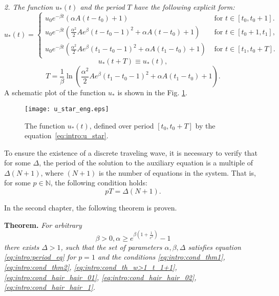 \textit{2. The function $u_*(t)$ and the period $T$ have the following explicit form:}
%
\small
\begin{equation}
	\label{eq:intro:u_star}
	u_*(t)=
	\begin{cases}
		u_0 e^{-\beta t}(\alpha A(t-t_0)+1) & \text{ for } t\in[t_0,t_0+1].
		\\
		u_0 e^{-\beta t}\left(\frac{\alpha^2}{2}Ae^{\beta}(t-t_0-1)^2+\alpha A(t-t_0)+1\right) & \text{ for } t\in[t_0+1,t_1],
		\\
		u_0 e^{-\beta t}\left(\frac{\alpha^2}{2}Ae^{\beta}(t_1-t_0-1)^2+\alpha A(t_1-t_0)+1\right) & \text{ for } t\in[t_1,t_0+T].
	\end{cases}
\end{equation}
\normalsize
%
\[
u_*(t + T) \equiv u_*(t),
\]
%
\begin{equation}
	\label{eq:intro:mg_period_T}
	T = \dfrac{1}{\beta}\ln\left( \frac{\alpha^2}{2}Ae^{\beta}(t_1-t_0-1)^2+\alpha A(t_1-t_0)+1\right). 
\end{equation}
%
A schematic plot of the function $u_*$ is shown in the Fig. \ref{fig:intro:u_star}.
%
\begin{figure}[h]
	\centering
	\texttt{[image: u\_star\_eng.eps]}
	\caption{The function $u_*(t)$, defined over period $[t_0, t_0 + T]$ by the equation~\eqref{eq:intro:u_star}.}
	\label{fig:intro:u_star}
\end{figure}

To ensure the existence of a discrete traveling wave, it is necessary to verify that for some $\Delta$, the period of the solution to the auxiliary equation is a multiple of $\Delta (N + 1)$, where $(N + 1)$ is the number of equations in the system. That is, for some $p \in \mathbb{N}$, the following condition holds:
\begin{equation}
	\label{eq:intro:period_eq}
	pT = \Delta (N + 1).
\end{equation}

In the second chapter, the following theorem is proven.

\textbf{Theorem.} \textit{For arbitrary
	\begin{equation}
		\label{eq:intro:constraints_parameters_final}
		\beta > 0, \alpha \geq e^{\beta\left(1 + \frac{1}{e^{\beta}}\right)} - 1
	\end{equation}
	there exists $\Delta > 1$, such that the set of parameters $\alpha, \beta, \Delta$ satisfies equation \eqref{eq:intro:period_eq} for $p = 1$ and the conditions \eqref{eq:intro:cond_thm1}, \eqref{eq:intro:cond_thm2}, \eqref{eq:intro:cond_th_w>1_t_1+1}, \eqref{eq:intro:cond_hair_hair_01}, \eqref{eq:intro:cond_hair_hair_02}, \eqref{eq:intro:cond_hair_hair_1}.}
	
